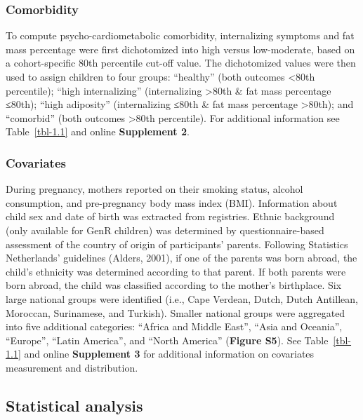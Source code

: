 \documentclass[
  letterpaper,
  DIV=11,
  numbers=noendperiod]{scrreport}
\begin{document}
\subsubsection{Comorbidity}\label{comorbidity}

To compute psycho-cardiometabolic comorbidity, internalizing symptoms
and fat mass percentage were first dichotomized into high versus
low-moderate, based on a cohort-specific 80th percentile cut-off value.
The dichotomized values were then used to assign children to four
groups: ``healthy'' (both outcomes \textless80th percentile); ``high
internalizing'' (internalizing \textgreater80th \& fat mass percentage
≤80th); ``high adiposity'' (internalizing ≤80th \& fat mass percentage
\textgreater80th); and ``comorbid'' (both outcomes \textgreater80th
percentile). For additional information see Table~\ref{tbl-1.1} and
online \textbf{Supplement 2}.

\subsubsection{Covariates}\label{covariates}

During pregnancy, mothers reported on their smoking status, alcohol
consumption, and pre-pregnancy body mass index (BMI). Information about
child sex and date of birth was extracted from registries. Ethnic
background (only available for GenR children) was determined by
questionnaire-based assessment of the country of origin of participants'
parents. Following Statistics Netherlands' guidelines (Alders, 2001), if
one of the parents was born abroad, the child's ethnicity was determined
according to that parent. If both parents were born abroad, the child
was classified according to the mother's birthplace. Six large national
groups were identified (i.e., Cape Verdean, Dutch, Dutch Antillean,
Moroccan, Surinamese, and Turkish). Smaller national groups were
aggregated into five additional categories: ``Africa and Middle East'',
``Asia and Oceania'', ``Europe'', ``Latin America'', and ``North
America'' (\textbf{Figure S5}). See Table~\ref{tbl-1.1} and online
\textbf{Supplement 3} for additional information on covariates
measurement and distribution.

\subsection{Statistical analysis}\label{statistical-analysis}
\end{document}
